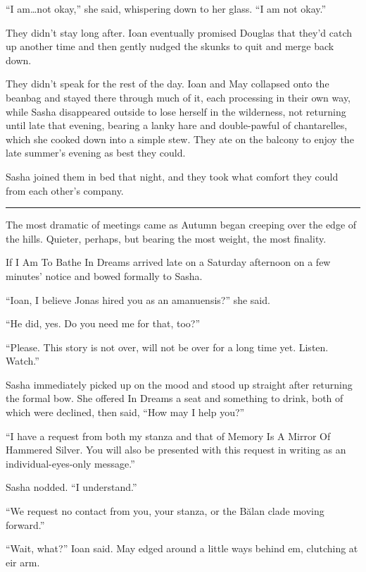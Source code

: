``I am\ldots not okay,'' she said, whispering down to her glass. ``I am not okay.''

They didn't stay long after. Ioan eventually promised Douglas that they'd catch up another time and then gently nudged the skunks to quit and merge back down.

They didn't speak for the rest of the day. Ioan and May collapsed onto the beanbag and stayed there through much of it, each processing in their own way, while Sasha disappeared outside to lose herself in the wilderness, not returning until late that evening, bearing a lanky hare and double-pawful of chantarelles, which she cooked down into a simple stew. They ate on the balcony to enjoy the late summer's evening as best they could.

Sasha joined them in bed that night, and they took what comfort they could from each other's company.

\begin{center}\rule{0.5\linewidth}{0.5pt}\end{center}

The most dramatic of meetings came as Autumn began creeping over the edge of the hills. Quieter, perhaps, but bearing the most weight, the most finality.

If I Am To Bathe In Dreams arrived late on a Saturday afternoon on a few minutes' notice and bowed formally to Sasha.

``Ioan, I believe Jonas hired you as an amanuensis?'' she said.

``He did, yes. Do you need me for that, too?''

``Please. This story is not over, will not be over for a long time yet. Listen. Watch.''

Sasha immediately picked up on the mood and stood up straight after returning the formal bow. She offered In Dreams a seat and something to drink, both of which were declined, then said, ``How may I help you?''

``I have a request from both my stanza and that of Memory Is A Mirror Of Hammered Silver. You will also be presented with this request in writing as an individual-eyes-only message.''

Sasha nodded. ``I understand.''

``We request no contact from you, your stanza, or the Bălan clade moving forward.''

``Wait, what?'' Ioan said. May edged around a little ways behind em, clutching at eir arm.

